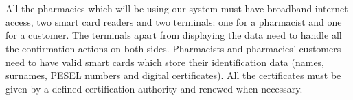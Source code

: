 \chapter{   }


All the pharmacies which will be using our system must have broadband internet access, two smart card readers and two terminals: one for a pharmacist and one for a customer. The terminals apart from displaying the data need to handle all the confirmation actions on both sides. \newline
Pharmacists and pharmacies’ customers need to have valid smart cards which store their identification data (names, surnames, PESEL numbers and digital certificates). All the certificates must be given by a defined certification authority and renewed when necessary.



\textbf{}

